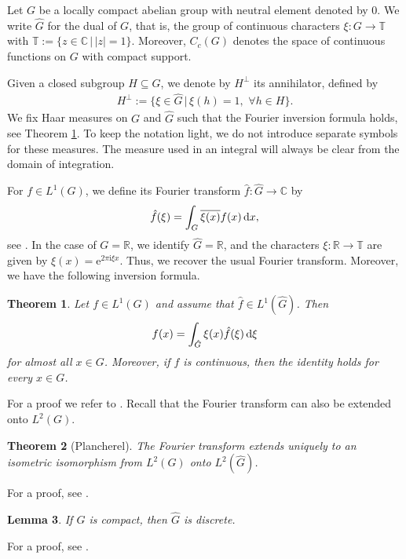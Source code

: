 \documentclass{article}
\renewcommand{\i}{\mathrm{i}}
\renewcommand{\d}{\, \textup{d}}
\newcommand{\T}{\mathbb{T}}
\newtheorem{theorem}{Theorem}[section]
\newtheorem{lemma}[theorem]{Lemma}
\newcommand{\C}{\mathbb{C}}
\newcommand{\R}{\mathbb{R}}
\begin{document}
Let $G$ be a locally compact abelian group with neutral element denoted by $0$. We write $\hat{G}$ for the dual of $G$, that is, the group of continuous characters $\xi: G\to \mathbb T$ with $\T:=\{ z \in \C \, \vert \, \vert z \vert=1\}$. Moreover, $C_c(G)$ denotes the space of continuous functions on $G$ with compact support.

Given a closed subgroup $H \subseteq G$, we denote by $H^\perp$ its annihilator, defined by 
\begin{align*}
    H^\perp:=\{ \xi \in \hat{G} \, \vert \, \xi(h)=1, \, \, \forall h \in H\}.
\end{align*}
We fix Haar measures on $G$ and $\hat{G}$ such that the Fourier inversion formula holds, see Theorem \ref{theorem:Fourierinversion}. To keep the notation light, we do not introduce separate symbols for these measures. The measure used in an integral will always be clear from the domain of integration.

For $f \in L^1(G)$, we define its Fourier transform $\hat{f}:\hat{G} \to \C$ by
\begin{align*}
    \hat{f}(\xi)= \int_G \overline{\xi(x)} f(x) \d x,
\end{align*}
see \cite[Chapter 4.2]{Folland}. In the case of $G=\mathbb{R}$, we identify $\hat{G}=\mathbb{R}$, and the characters $\xi: \R \to \T$ are given by $\xi(x)=\mathrm{e}^{2\pi \i \xi x}$. Thus, we recover the usual Fourier transform.
Moreover, we have the following inversion formula.
\begin{theorem}\label{theorem:Fourierinversion}
    Let $f \in L^1(G)$ and assume that $\hat{f}\in L^1(\hat{G})$. Then 
    \begin{align*}
        f(x)= \int_{\hat{G}} \xi(x) \hat{f}(\xi) \d \xi
    \end{align*}
for almost all $x \in G$. Moreover, if $f$ is continuous, then the identity holds for every $x \in G$.
\end{theorem}
For a proof we refer to \cite[Theorem 4.32]{Folland}.  
Recall that the Fourier transform can also be extended onto $L^2(G)$.
\begin{theorem}[Plancherel]\label{theorem:Plancherel}
    The Fourier transform extends uniquely to an isometric isomorphism from $L^2(G)$ onto $L^2(\hat{G})$.
\end{theorem}
For a proof, see \cite[Theorem 4.25]{Folland}.

\begin{lemma}\label{lemma:compactdiscrete}
If $G$ is compact, then $\hat{G}$ is discrete.
\end{lemma}
For a proof, see \cite[Proposition 4.4]{Folland}.
\end{document}
